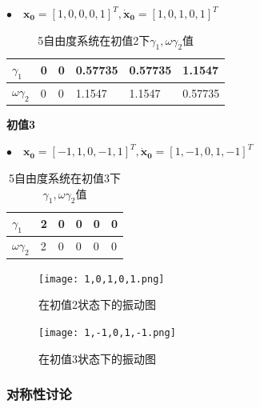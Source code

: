 \documentclass[11pt, a4paper, oneside]{ctexart}
\begin{document}
{{{$\bullet\quad\boldsymbol{x_0}=[1,0,0,0,1]^T,
\boldsymbol{\dot x_0}=[1,0,1,0,1]^T
$

\begin{table}[h]
    \centering
    \caption{5自由度系统在初值2下$\gamma_1,\omega\gamma_2值$}

    \begin{tabular}{@{}p{1cm}<{\centering}p{2cm}<{\centering}p{2cm}<{\centering}p{2cm}<{\centering}p{2cm}<{\centering}p{2cm}<{\centering}@{}}
    \toprule
    $\gamma_1$       & 0 & 0 & 0.57735 & 0.57735 & 1.1547 \\ \midrule
    $\omega\gamma_2$ & 0   & 0   & 1.1547         &    1.1547       & 0.57735        \\ \bottomrule
    \end{tabular}
    \end{table}
    \vspace{2mm}
    \textbf{初值3}

    $\bullet\quad\boldsymbol{x_0}=[-1,1,0,-1,1]^T,
    \boldsymbol{\dot x_0}=[1,-1,0,1,-1]^T
    $

    \begin{table}[h]
        \caption{5自由度系统在初值3下$\gamma_1,\omega\gamma_2值$}
        \centering
        \begin{tabular}{@{}p{1cm}<{\centering}p{2cm}<{\centering}p{2cm}<{\centering}p{2cm}<{\centering}p{2cm}<{\centering}p{2cm}<{\centering}@{}}
        \toprule
        $\gamma_1$       & 2 & 0 & 0 & 0 & 0 \\ \midrule
        $\omega\gamma_2$ & 2   & 0   & 0        &    0       & 0     \\ \bottomrule
        \end{tabular}
        \end{table}


    \begin{figure}[h]
        
        \centering
        \vspace{2mm}
        \texttt{[image: 1,0,1,0,1.png]}
        \caption{在初值2状态下的振动图 }
    \end{figure} 

    \begin{figure}[H]
        
        \centering
        \vspace{2mm}
        \texttt{[image: 1,-1,0,1,-1.png]}
        \caption{在初值3状态下的振动图 }
    \end{figure} 
    

\subsubsection{对称性讨论}

}}}
\end{document}

